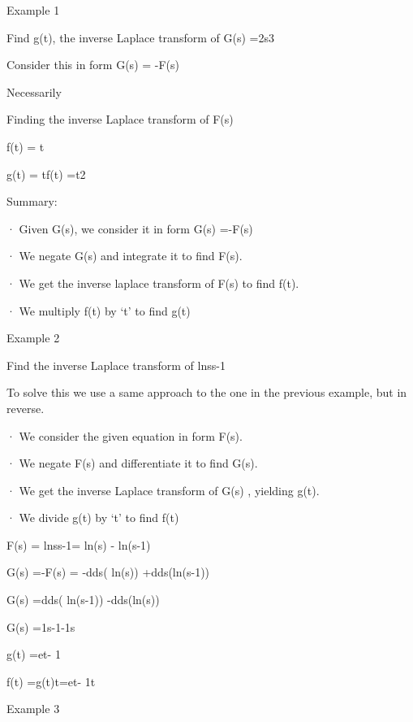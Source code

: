 
\newpage
 

Example 1

Find g(t), the inverse Laplace transform of G(s) =2s3

Consider this in form G(s) = -F(s)

Necessarily 

 

Finding the inverse Laplace transform of F(s)

 

f(t) = t

 


g(t) = tf(t) =t2

 

Summary:

·       Given G(s), we consider it in form G(s) =-F(s)

·       We negate G(s) and integrate it to find F(s).

·       We get the inverse laplace transform of F(s) to find f(t).

·       We multiply f(t) by ‘t’ to find g(t)

 
\newpage
Example 2

Find the inverse Laplace transform of lnss-1

 

To solve this we use a same approach to the one in the previous example, but in reverse.

 

·       We consider the given equation in form F(s).

·       We negate F(s) and differentiate it to find G(s).

·       We get the inverse Laplace transform of G(s) , yielding g(t).

·       We divide g(t) by ‘t’ to find f(t)

 

 F(s) = lnss-1= ln(s) - ln(s-1)           

G(s) =-F(s) = -dds( ln(s)) +dds(ln(s-1))


G(s) =dds( ln(s-1)) -dds(ln(s))


G(s) =1s-1-1s


g(t) =et- 1


f(t) =g(t)t=et- 1t

\newpage

 Example 3


